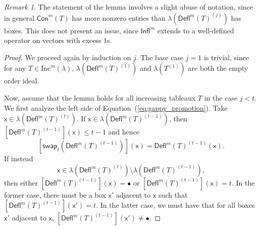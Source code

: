\documentclass[12pt]{amsart}
\newcommand{\x}{\ensuremath{\mathsf{x}}}
\theoremstyle{definition}
\theoremstyle{remark}
\newtheorem{remark}[theorem]{Remark}
\numberwithin{equation}{section}
\renewcommand{\emptyset}{\varnothing}
\newcommand{\inc}{\ensuremath{\mathrm{Inc}}}
\newcommand{\swap}{\ensuremath{\mathsf{swap}}}
\newcommand{\rep}{\ensuremath{\mathsf{Rep}}}
\newcommand{\deflate}{\ensuremath{\mathsf{Defl}}}
\newcommand{\tinflate}{\ensuremath{\mathsf{Infl}}}
\newcommand{\content}{\ensuremath{\mathsf{Con}}}
\begin{document}
\begin{remark}The statement of the lemma involves a slight abuse of notation, since in general $\content^m(T)$ has more nonzero entries than $\lambda(\deflate^m(T)^{(j)})$ has boxes. This does not present an issue, since $\tinflate^m$ extends to a well-defined operator on vectors with excess $1$s.
\end{remark}
\begin{proof}  We proceed again by induction on $j$. The base case $j=1$ is trivial, since for any $T \in \inc^m(\lambda)$, $\lambda \left( \deflate^m(T)^{(1)} \right)$ and $\lambda \left( T^{(1)} \right)$ are both the empty order ideal.

Now, assume that the lemma holds for all increasing tableaux $T$ in the case $j < t$. We first analyze the left side of Equation~(\ref{eq:gappy_promotion}). Take $\x \in \lambda\left( \deflate^m(T)^{(t)} \right)$. If $\x \in \lambda\left( \deflate^m(T)^{(t-1)} \right)$, then 
$[\deflate^m(T)^{(t-1)}](\x) \leq t-1$ and hence
\[
\left[ \swap_{t}(\deflate^m(T)^{(t-1)})\right](\x) = \deflate^m(T)^{(t-1)}(\x).
\]
 If instead
 \[\x \in \lambda\left(\deflate^m(T)^{(t)}\right) \setminus \lambda\left(\deflate^m(T)^{(t-1)}\right),\]
  then either $[\deflate^m(T)^{(t-1)}](\x) = \bullet$ or $[\deflate^m(T)^{(t-1)}](\x) = t$. In the former case, there must be a box $\x'$ adjacent to $\x$ such that $[\deflate^m(T)^{(t-1)}](\x') = t$. In the latter case, we must have that for all boxes $\x'$ adjacent to $\x$, $[\deflate^m(T)^{(t-1)}](\x') \neq \bullet$. 


\end{proof}
\end{document}
